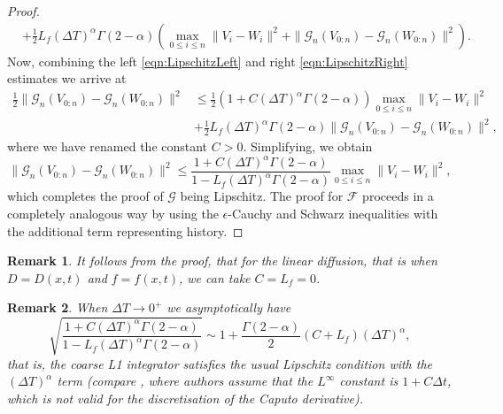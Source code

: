 \documentclass[12pt,a4paper]{article}
\newtheorem{rem}{Remark}
\begin{document}
\begin{proof}
\begin{equation}
\begin{split}
			&+ \frac{1}{2}L_f \left(\Delta T\right)^\alpha \Gamma(2-\alpha) \left(\max_{0\leq i \leq n}\|V_i - W_i\|^2 + \|\mathcal{G}_n\left(V_{0:n}\right) - \mathcal{G}_n\left(W_{0:n}\right)\|^2\right).
		\end{split}
	\end{equation}
	Now, combining the left \eqref{eqn:LipschitzLeft} and right \eqref{eqn:LipschitzRight} estimates we arrive at
	\begin{equation}
		\begin{split}
			\frac{1}{2}\|\mathcal{G}_n\left(V_{0:n}\right) - \mathcal{G}_n\left(W_{0:n}\right)\|^2 &\leq \frac{1}{2}\left(1+C (\Delta T)^\alpha \Gamma(2-\alpha)\right) \max_{0\leq i\leq n}\|V_i - W_i\|^2 \\
			&+  \frac{1}{2}L_f \left(\Delta T\right)^\alpha \Gamma(2-\alpha) \|\mathcal{G}_n\left(V_{0:n}\right) - \mathcal{G}_n\left(W_{0:n}\right)\|^2,
		\end{split}
	\end{equation}
	where we have renamed the constant $C>0$. Simplifying, we obtain
	\begin{equation}
		\|\mathcal{G}_n\left(V_{0:n}\right) - \mathcal{G}_n\left(W_{0:n}\right)\|^2 \leq \frac{1+C (\Delta T)^\alpha \Gamma(2-\alpha)}{1-L_f \left(\Delta T\right)^\alpha \Gamma(2-\alpha)} \max_{0\leq i\leq n}\|V_i - W_i\|^2,
	\end{equation}
	which completes the proof of $\mathcal{G}$ being Lipschitz. The proof for $\mathcal{F}$ proceeds in a completely analogous way by using the $\epsilon$-Cauchy and Schwarz inequalities with the additional term representing history. 
\end{proof}

\begin{rem}
	It follows from the proof, that for the linear diffusion, that is when $D=D(x,t)$ and $f=f(x,t)$, we can take $C = L_f = 0$.
\end{rem}

\begin{rem}
	When $\Delta T \rightarrow 0^+$ we asymptotically have
	\begin{equation}
		\sqrt{\frac{1+C (\Delta T)^\alpha \Gamma(2-\alpha)}{1-L_f \left(\Delta T\right)^\alpha \Gamma(2-\alpha)}} \sim 1 + \frac{\Gamma(2-\alpha)}{2} (C+L_f) \left(\Delta T\right)^\alpha,
	\end{equation}
	that is, the coarse L1 integrator satisfies the usual Lipschitz condition with the $(\Delta T)^\alpha$ term (compare \cite{xu2015parareal}, where authors assume that the $L^\infty$ constant is $1+C \Delta t$, which is not valid for the discretisation of the Caputo derivative). 
\end{rem}
\end{document}
